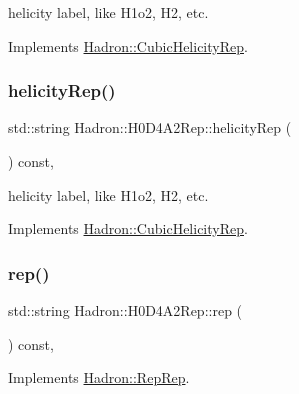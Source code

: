 helicity label, like H1o2, H2, etc. 

Implements \mbox{\hyperlink{structHadron_1_1CubicHelicityRep_af1096946b7470edf0a55451cc662f231}{Hadron\+::\+Cubic\+Helicity\+Rep}}.

\mbox{\label{structHadron_1_1H0D4A2Rep_a4998188757fbc152763b632ab09afbcf}} 
\subsubsection{\texorpdfstring{helicityRep()}{helicityRep()}\hspace{0.1cm}{\footnotesize\ttfamily [3/3]}}
{\footnotesize\ttfamily std\+::string Hadron\+::\+H0\+D4\+A2\+Rep\+::helicity\+Rep (\begin{DoxyParamCaption}{ }\end{DoxyParamCaption}) const\hspace{0.3cm}{\ttfamily [inline]}, {\ttfamily [virtual]}}

helicity label, like H1o2, H2, etc. 

Implements \mbox{\hyperlink{structHadron_1_1CubicHelicityRep_af1096946b7470edf0a55451cc662f231}{Hadron\+::\+Cubic\+Helicity\+Rep}}.

\mbox{\label{structHadron_1_1H0D4A2Rep_ad23c66fe369200d0ff8bebcabf8dfc62}} 
\subsubsection{\texorpdfstring{rep()}{rep()}\hspace{0.1cm}{\footnotesize\ttfamily [1/5]}}
{\footnotesize\ttfamily std\+::string Hadron\+::\+H0\+D4\+A2\+Rep\+::rep (\begin{DoxyParamCaption}{ }\end{DoxyParamCaption}) const\hspace{0.3cm}{\ttfamily [inline]}, {\ttfamily [virtual]}}



Implements \mbox{\hyperlink{structHadron_1_1RepRep_ab3213025f6de249f7095892109575fde}{Hadron\+::\+Rep\+Rep}}.

\mbox{\label{structHadron_1_1H0D4A2Rep_ad23c66fe369200d0ff8bebcabf8dfc62}} 
